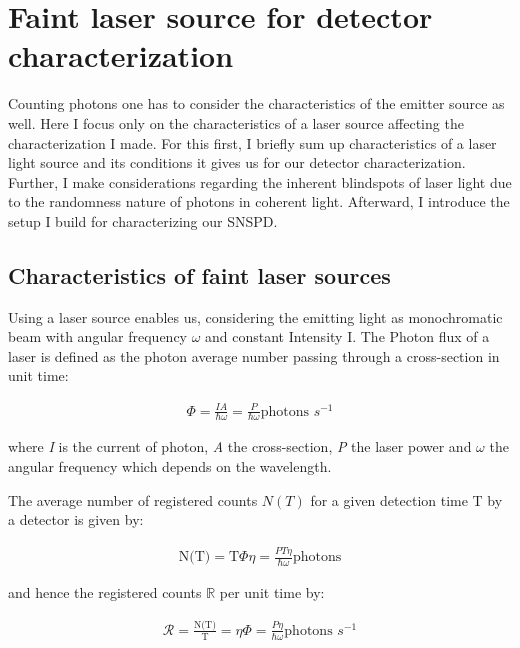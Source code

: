 
\chapter{Faint laser source for detector characterization}
\label{sec:SNSPD_setup}

Counting photons one has to consider the characteristics of the emitter source as well.
Here I focus only on the characteristics of a laser source affecting the characterization I made.
For this first, I briefly sum up characteristics of a laser light source and its conditions it gives us for our detector
characterization.
Further, I make considerations regarding the inherent blindspots of laser light due to the randomness nature of photons
in coherent light.
Afterward, I introduce the setup I build for characterizing our SNSPD.\\

\section*{Characteristics of faint laser sources}

Using a laser source enables us, considering the emitting light as monochromatic beam with angular frequency $\omega$
and constant Intensity I. The Photon flux of a laser is defined as the photon average number passing through
a cross-section in unit time:

\begin{align}
    \Phi = \frac{I A}{\hbar \omega} = \frac{P}{\hbar \omega} \text{photons $s^{-1}$}
\end{align}

where \textit{I} is the current of photon, \textit{A} the cross-section, \textit{P} the laser power and $\omega$ the angular frequency which
depends on the wavelength.

The average number of registered counts $N(T)$ for a given detection time T by a detector is given by:

\begin{align}
    \text{N(T)} = \text{T} \Phi \eta= \frac{P T \eta}{\hbar \omega} \text{photons}
\end{align}

and hence the registered counts $\mathbb{R}$ per unit time by:

\begin{align}
    \mathcal{R} = \frac{\text{N(T)}}{\text{T}} = \eta \Phi= \frac{P \eta}{\hbar \omega} \text{photons  $s^{-1}$}
\end{align}

